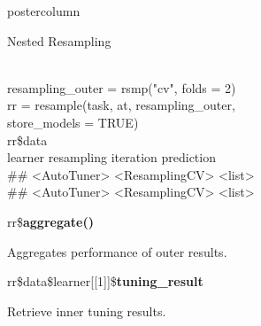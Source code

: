 \documentclass{beamer}
\begin{document}
\begin{frame}[fragile]{}
\begin{columns}
\begin{column}{.245\textwidth}
\begin{beamercolorbox}[center]{postercolumn}
\begin{minipage}{.98\textwidth}
{\begin{myblock}{Nested Resampling}
\begin{codeboxexample}
{									\\
									resampling\_outer = rsmp("cv", folds = 2)\\
									rr = resample(task, at, resampling\_outer, \\
									\hspace*{1ex}store\_models = TRUE)
									\vspace{1em}
									\\
									rr\$data
									\vspace{1em}
									\\
									\phantom{n} \space\space\space\space\space learner \space\space\space\space resampling iteration prediction\\
									 \#\# <AutoTuner> <ResamplingCV> \space\space\space\space\space\space\space{} \space\space\space\space <list>\\
									 \#\# <AutoTuner> <ResamplingCV> \space\space\space\space\space\space\space{} \space\space\space\space <list>\\}
							\end{codeboxexample}
							\vspace{1em}
							\begin{codebox}
								rr\$\textbf{aggregate()}
							\end{codebox}
							Aggregates performance of outer results.
							\\
							\begin{codebox}
								rr\$data\$learner[[1]]\$\textbf{tuning\_result}
							\end{codebox}
							Retrieve inner tuning results.
						\end{myblock}
						\vfill}
				\end{minipage}
			\end{beamercolorbox}
		\end{column}
	\end{columns}
\end{frame}
\end{document}
